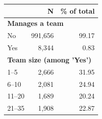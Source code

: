 \begin{tabular}{lrr}


\toprule


 & N & \% of total \\


\midrule


\multicolumn{3}{l}{\textbf{Manages a team}}\\ 
\midrule
No                  &     991,656&       99.17\\
Yes                 &       8,344&        0.83\\
\midrule


\multicolumn{3}{l}{\textbf{Team size (among 'Yes')}}\\ 
\midrule
1–5                 &       2,666&       31.95\\
6–10                &       2,081&       24.94\\
11–20               &       1,689&       20.24\\
21–35               &       1,908&       22.87\\
\bottomrule


\end{tabular}


